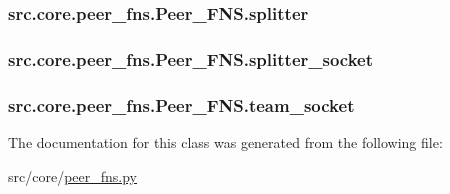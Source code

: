 \subsubsection[{splitter}]{\setlength{\rightskip}{0pt plus 5cm}src.\+core.\+peer\+\_\+fns.\+Peer\+\_\+\+F\+N\+S.\+splitter}\label{classsrc_1_1core_1_1peer__fns_1_1Peer__FNS_a805fbda31ea75f27a7e199233386bfb8}
\hypertarget{classsrc_1_1core_1_1peer__fns_1_1Peer__FNS_a64da3201be6d30b32b753aebe3912f2a}{}
\subsubsection[{splitter\+\_\+socket}]{\setlength{\rightskip}{0pt plus 5cm}src.\+core.\+peer\+\_\+fns.\+Peer\+\_\+\+F\+N\+S.\+splitter\+\_\+socket}\label{classsrc_1_1core_1_1peer__fns_1_1Peer__FNS_a64da3201be6d30b32b753aebe3912f2a}
\hypertarget{classsrc_1_1core_1_1peer__fns_1_1Peer__FNS_a3719c51b8e616b9d2ad093d9a3543e26}{}
\subsubsection[{team\+\_\+socket}]{\setlength{\rightskip}{0pt plus 5cm}src.\+core.\+peer\+\_\+fns.\+Peer\+\_\+\+F\+N\+S.\+team\+\_\+socket}\label{classsrc_1_1core_1_1peer__fns_1_1Peer__FNS_a3719c51b8e616b9d2ad093d9a3543e26}


The documentation for this class was generated from the following file\+:\begin{DoxyCompactItemize}
\item 
src/core/\hyperlink{peer__fns_8py}{peer\+\_\+fns.\+py}\end{DoxyCompactItemize}
